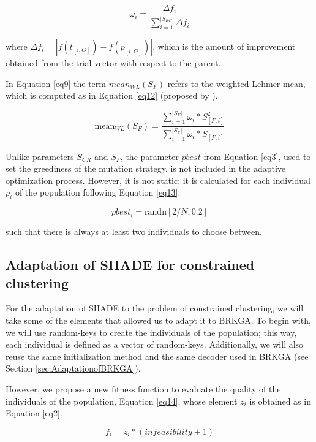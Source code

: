 \documentclass[review]{elsarticle}
\begin{document}
\begin{equation}
\omega_i = \frac{\Delta f_i}{\sum_{i = 1}^{|S_{RC}|} \Delta f_i}
\label{eq11}
\end{equation}

where $\Delta f_i = |f(t_{[i,G]}) - f(p_{[i, G]})|$, which is the amount of improvement obtained from the trial vector with respect to the parent.

In Equation \ref{eq9} the term $mean_{WL} (S_{F})$ refers to the weighted Lehmer mean, which is computed as in Equation \eqref{eq12} (proposed by \cite{tanabe2013success}).

\begin{equation}
\text{mean}_{WL} (S_{F}) = \frac{\sum_{i = 1}^{|S_{F}|} \omega_i * S^2_{[F,i]}}{\sum_{i = 1}^{|S_{F}|} \omega_i * S_{[F,i]}}
\label{eq12}
\end{equation}

Unlike parameters $S_{CR}$ and $S_F$, the parameter $pbest$ from Equation \eqref{eq3}, used to set the greediness of the mutation strategy, is not included in the adaptive optimization process. However, it is not static: it is calculated for each individual $p_i$ of the population following Equation \eqref{eq13}.

\begin{equation}
pbest_i = \text{randn}[2/N, 0.2]
\label{eq13}
\end{equation}

such that there is always at least two individuals to choose between.

\subsection{Adaptation of SHADE for constrained clustering}

For the adaptation of SHADE to the problem of constrained clustering, we will take some of the elements that allowed us to adapt it to BRKGA. To begin with, we will use random-keys to create the individuals of the population; this way, each individual is defined as a vector of random-keys. Additionally, we will also reuse the same initialization method and the same decoder used in BRKGA (see Section \ref{sec:AdaptationofBRKGA}).

However, we propose a new fitness function to evaluate the quality of the individuals of the population, Equation \eqref{eq14}, whose element $z_i$ is obtained as in Equation \eqref{eq2}.

\begin{equation}
f_i = z_i * (infeasibility + 1)
\label{eq14}
\end{equation}
\end{document}
